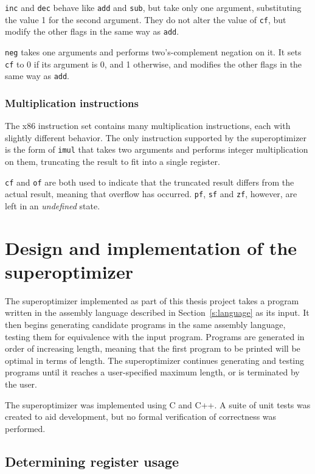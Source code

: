 \documentclass[a4paper,11pt]{kth-mag}
\begin{document}
\verb|inc| and \verb|dec| behave like \verb|add| and \verb|sub|, but take only one argument, substituting the value 1 for the second argument.
They do not alter the value of \verb|cf|, but modify the other flags in the same way as \verb|add|.

\verb|neg| takes one arguments and performs two's-complement negation on it.
It sets \verb|cf| to 0 if its argument is 0, and 1 otherwise, and modifies the other flags in the same way as \verb|add|.

\subsection{Multiplication instructions}

The x86 instruction set contains many multiplication instructions, each with slightly different behavior.
The only instruction supported by the superoptimizer is the form of \verb|imul| that takes two arguments and performs integer multiplication on them, truncating the result to fit into a single register.

\verb|cf| and \verb|of| are both used to indicate that the truncated result differs from the actual result, meaning that overflow has occurred.
\verb|pf|, \verb|sf| and \verb|zf|, however, are left in an \emph{undefined} state.

\chapter{Design and implementation of the superoptimizer}
\label{ch:design_implementation}

The superoptimizer implemented as part of this thesis project takes a program written in the assembly language described in Section~\ref{s:language} as its input.
It then begins generating candidate programs in the same assembly language, testing them for equivalence with the input program.
Programs are generated in order of increasing length, meaning that the first program to be printed will be optimal in terms of length.
The superoptimizer continues generating and testing programs until it reaches a user-specified maximum length, or is terminated by the user.


The superoptimizer was implemented using C and C++.
A suite of unit tests was created to aid development, but no formal verification of correctness was performed.

\section{Determining register usage}
\end{document}

